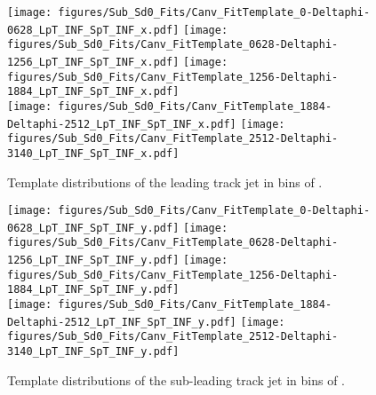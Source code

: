 \begin{figure}[htbp]
  \centering
 \texttt{[image: figures/Sub\_Sd0\_Fits/Canv\_FitTemplate\_0-Deltaphi-0628\_LpT\_INF\_SpT\_INF\_x.pdf]}
 \texttt{[image: figures/Sub\_Sd0\_Fits/Canv\_FitTemplate\_0628-Deltaphi-1256\_LpT\_INF\_SpT\_INF\_x.pdf]}
 \texttt{[image: figures/Sub\_Sd0\_Fits/Canv\_FitTemplate\_1256-Deltaphi-1884\_LpT\_INF\_SpT\_INF\_x.pdf]}\\
 \texttt{[image: figures/Sub\_Sd0\_Fits/Canv\_FitTemplate\_1884-Deltaphi-2512\_LpT\_INF\_SpT\_INF\_x.pdf]}
 \texttt{[image: figures/Sub\_Sd0\_Fits/Canv\_FitTemplate\_2512-Deltaphi-3140\_LpT\_INF\_SpT\_INF\_x.pdf]}

\caption{Template \subsdzero distributions of the leading track jet in bins of \dphi. }
  \label{fig:dphi-template-leading}
\end{figure}


\begin{figure}[htbp]
  \centering
 \texttt{[image: figures/Sub\_Sd0\_Fits/Canv\_FitTemplate\_0-Deltaphi-0628\_LpT\_INF\_SpT\_INF\_y.pdf]}
 \texttt{[image: figures/Sub\_Sd0\_Fits/Canv\_FitTemplate\_0628-Deltaphi-1256\_LpT\_INF\_SpT\_INF\_y.pdf]}
 \texttt{[image: figures/Sub\_Sd0\_Fits/Canv\_FitTemplate\_1256-Deltaphi-1884\_LpT\_INF\_SpT\_INF\_y.pdf]}\\
 \texttt{[image: figures/Sub\_Sd0\_Fits/Canv\_FitTemplate\_1884-Deltaphi-2512\_LpT\_INF\_SpT\_INF\_y.pdf]}
 \texttt{[image: figures/Sub\_Sd0\_Fits/Canv\_FitTemplate\_2512-Deltaphi-3140\_LpT\_INF\_SpT\_INF\_y.pdf]}

\caption{Template \subsdzero distributions of the sub-leading track jet in bins of \dphi. }
  \label{fig:dphi-template-subleading}
\end{figure}

